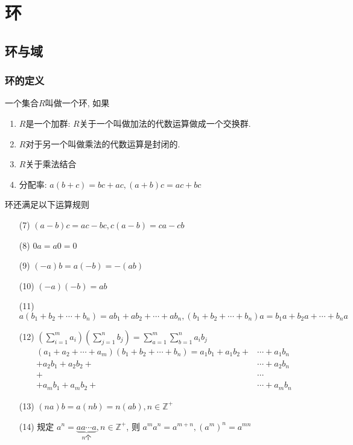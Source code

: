 \chapter{环}

\section{环与域}

\subsection{环的定义}

\begin{Definition}[环]
一个集合$R$叫做一个环, 如果
\begin{enumerate}[(1)]
	\item $R$是一个加群: $R$关于一个叫做加法的代数运算做成一个交换群.
	\item $R$对于另一个叫做乘法的代数运算是封闭的.
	\item $R$关于乘法结合
	\item 分配率: $a(b+c) = bc + ac, (a+b)c = ac + bc$
\end{enumerate}
\end{Definition}

\begin{Theorem}
环还满足以下运算规则
\begin{enumerate}[(1)]
\item[(7)] $(a-b)c = ac - bc, c(a - b) = ca - cb$
\item[(8)] $\mathfrak{0}a = a\mathfrak{0} = \mathfrak{0}$
\item[(9)] $(-a)b = a(-b) = -(ab)$
\item[(10)] $(-a)(-b) = ab$
\item[(11)] $a(b_1 + b_2 + \cdots + b_n) = ab_1 +ab_2 + \cdots + ab_n, (b_1 + b_2 + \cdots + b_n)a = b_1a + b_2a + \cdots + b_na$
\item[(12)] 
$ \displaystyle \left( \sum_{i=1}^m a_i \right) \left( \sum_{j=1}^n b_j \right) 
= \sum_{a=1}^m \sum_{b=1}^{n} a_i b_j $
           $$
\begin{aligned}
(a_1 + a_2 + \cdots + a_m) (b_1 + b_2 + \cdots + b_n) 
= 
a_1b_1 + a_1 b_2 + &\cdots + a_1 b_n \\
+ a_2 b_1 + a_2 b_2 + &\cdots + a_2 b_n \\
+ &\cdots \\
+ a_m b_1 + a_m b_2 + &\cdots + a_m b_n
\end{aligned}
 $$
 \item[(13)] $ (na)b = a(nb) = n(ab), n \in \mathbb{Z}^+$ 
 \item[(14)] 规定 $a^n = \underbrace{a a \cdots a}_{n\text{个}}, n \in \mathbb{Z}^{+}$, 则 $ a^m a^n = a^{m+n}, (a^m)^n = a^{mn} $
\end{enumerate}
\end{Theorem}


